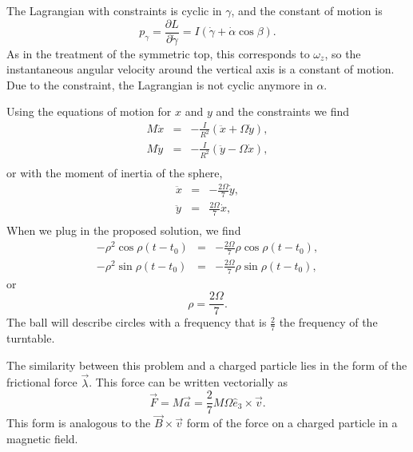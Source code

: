 \documentclass[letterpaper,11pt]{article}
\begin{document}
The Lagrangian with constraints is cyclic in $\gamma$, and the constant of motion is
\begin{equation*}
 p_\gamma = \frac{\partial L}{\partial \dot\gamma} = I \left( \dot\gamma + \dot\alpha \cos\beta \right).
\end{equation*}
As in the treatment of the symmetric top, this corresponds to $\omega_z$, so the instantaneous angular velocity around the vertical axis is a constant of motion.  Due to the constraint, the Lagrangian is not cyclic anymore in $\alpha$.

Using the equations of motion for $x$ and $y$ and the constraints we find
\begin{eqnarray*}
 M \ddot{x} & = & -\frac{I}{R^2} (\ddot{x} + \Omega \dot{y}), \\
 M \ddot{y} & = & -\frac{I}{R^2} (\ddot{y} - \Omega \dot{x}), \\
\end{eqnarray*}
or with the moment of inertia of the sphere,
\begin{eqnarray*}
 \ddot{x} & = & -\frac{2 \Omega}{7} \dot{y}, \\
 \ddot{y} & = & \frac{2 \Omega}{7} \dot{x}, \\
\end{eqnarray*}
When we plug in the proposed solution, we find
\begin{eqnarray*}
 -\rho^2 \cos\rho(t - t_0) & = & - \frac{2 \Omega}{7} \rho \cos\rho(t - t_0), \\
 -\rho^2 \sin\rho(t - t_0) & = & - \frac{2 \Omega}{7} \rho \sin\rho(t - t_0),
\end{eqnarray*}
or
\begin{equation*}
 \rho = \frac{2 \Omega}{7}.
\end{equation*}
The ball will describe circles with a frequency that is $\frac{2}{7}$ the frequency of the turntable.

The similarity between this problem and a charged particle lies in the form of the frictional force $\vec\lambda$.  This force can be written vectorially as
\begin{equation*}
 \vec{F} = M \vec{a} = \frac{2}{7} M \Omega\hat{e}_3 \times \vec{v}.
\end{equation*}
This form is analogous to the $\vec{B} \times \vec{v}$ form of the force on a charged particle in a magnetic field.
\end{document}
